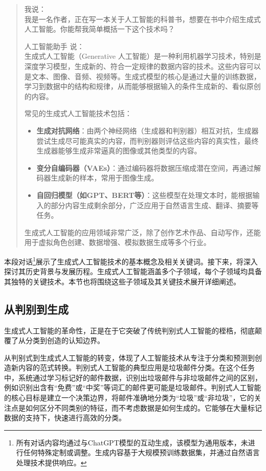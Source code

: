 \begin{quote}
我说：\\
我是一名作者，正在写一本关于人工智能的科普书，想要在书中介绍生成式人工智能。你能帮我简单概括一下这个技术吗？

人工智能助手 说：\\
生成式人工智能（Generative 人工智能）是一种利用机器学习技术，特别是深度学习模型，生成新的、符合一定规律的数据内容的技术。这些内容可以是文本、图像、音频、视频等。生成式模型的核心是通过大量的训练数据，学习到数据中的结构和规律，从而能够根据输入的条件生成新的、看似原创的内容。

常见的生成式人工智能技术包括：

\begin{itemize}
  \item \textbf{生成对抗网络}：由两个神经网络（生成器和判别器）相互对抗，生成器尝试生成尽可能真实的内容，而判别器则评估这些内容的真实性，最终生成器能够生成非常逼真的图像或其他类型的内容。
  \item \textbf{变分自编码器（VAEs）}：通过编码器将数据压缩成潜在空间，再通过解码器生成新的样本，常用于图像生成。
  \item \textbf{自回归模型（如GPT、BERT等）}：这些模型在处理文本时，能根据输入的部分内容生成剩余部分，广泛应用于自然语言生成、翻译、摘要等任务。
\end{itemize}

生成式人工智能的应用领域非常广泛，除了创作艺术作品、自动写作，还能用于虚拟角色创建、数据增强、模拟数据生成等多个行业。


\end{quote}



本段对话\footnote{所有对话内容均通过与ChatGPT模型的互动生成，该模型为通用版本，未进行任何特殊定制或调整。生成内容基于大规模预训练数据集，并通过自然语言处理技术提供响应。}展示了生成式人工智能技术的基本概念及相关关键词。接下来，将深入探讨其历史背景与发展历程。生成式人工智能涵盖多个子领域，每个子领域均具备其独特的关键技术。本节也将围绕这些子领域及其关键技术展开详细阐述。


\subsection{从判别到生成}

生成式人工智能的革命性，正是在于它突破了传统判别式人工智能的桎梏，彻底颠覆了从分类到创造的认知边界。

从判别式到生成式人工智能的转变，体现了人工智能技术从专注于分类和预测到创造新内容的范式转换。判别式人工智能的典型应用是垃圾邮件分类。在这个任务中，系统通过学习标记好的邮件数据，识别出垃圾邮件与非垃圾邮件之间的区别，例如识别出含有“免费”或“中奖”等词汇的邮件更可能是垃圾邮件。判别式人工智能的核心目标是建立一个决策边界，将邮件准确地分类为“垃圾”或“非垃圾”，它的关注点是如何区分不同类别的特征，而不考虑数据是如何生成的。它能够在大量标记数据的支持下，快速进行高效的分类。

